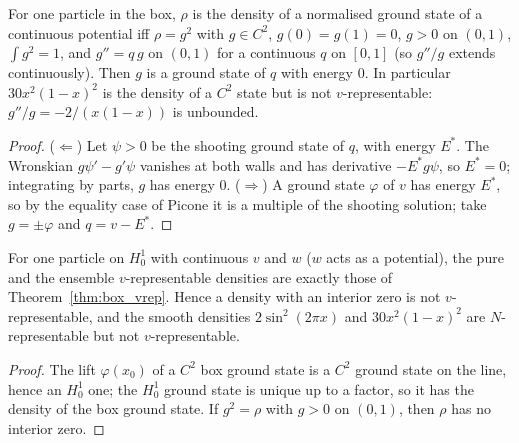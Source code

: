 \begin{theorem}
  \label{thm:box_vrep}
  \leanok
  For one particle in the box, $\rho$ is the density of a normalised ground state of a continuous potential iff
  $\rho=g^2$ with $g\in C^2$, $g(0)=g(1)=0$, $g>0$ on $(0,1)$, $\int g^2=1$, and $g''=q\,g$ on $(0,1)$ for a continuous
  $q$ on $[0,1]$ (so $g''/g$ extends continuously). Then $g$ is a ground state of $q$ with energy $0$. In particular
  $30x^2(1-x)^2$ is the density of a $C^2$ state but is not $v$-representable: $g''/g=-2/(x(1-x))$ is unbounded.
\end{theorem}
\begin{proof}
  \leanok
  ($\Leftarrow$) Let $\psi>0$ be the shooting ground state of $q$, with energy $E^*$. The Wronskian
  $g\psi'-g'\psi$ vanishes at both walls and has derivative $-E^*g\psi$, so $E^*=0$; integrating by parts, $g$ has
  energy $0$. ($\Rightarrow$) A ground state $\varphi$ of $v$ has energy $E^*$, so by the equality case of Picone it is a
  multiple of the shooting solution; take $g=\pm\varphi$ and $q=v-E^*$.
\end{proof}

\begin{theorem}
  \label{thm:one_W_vrep}
  \leanok
  For one particle on $H^1_0$ with continuous $v$ and $w$ ($w$ acts as a potential), the pure and the ensemble
  $v$-representable densities are exactly those of Theorem~\ref{thm:box_vrep}. Hence a density with an interior
  zero is not $v$-representable, and the smooth densities $2\sin^2(2\pi x)$ and $30x^2(1-x)^2$ are $N$-representable
  but not $v$-representable.
\end{theorem}
\begin{proof}
  \leanok
  The lift $\varphi(x_0)$ of a $C^2$ box ground state is a $C^2$ ground state on the line, hence an $H^1_0$ one; the
  $H^1_0$ ground state is unique up to a factor, so it has the density of the box ground state. If $g^2=\rho$ with
  $g>0$ on $(0,1)$, then $\rho$ has no interior zero.
\end{proof}

